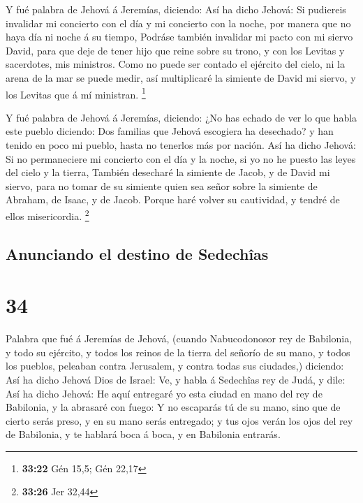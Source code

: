  Y fué palabra de Jehová á Jeremías, diciendo:
 Así ha dicho Jehová: Si pudiereis invalidar mi concierto
con el día y mi concierto con la noche, por manera que no haya día ni
noche á su tiempo,  Podráse también invalidar mi pacto
con mi siervo David, para que deje de tener hijo que reine sobre su
trono, y con los Levitas y sacerdotes, mis ministros. 
Como no puede ser contado el ejército del cielo, ni la arena de la mar
se puede medir, así multiplicaré la simiente de David mi siervo, y los
Levitas que á mí ministran. \footnote{\textbf{33:22} Gén 15,5; Gén 22,17}

 Y fué palabra de Jehová á Jeremías, diciendo:
 ¿No has echado de ver lo que habla este pueblo diciendo:
Dos familias que Jehová escogiera ha desechado? y han tenido en poco mi
pueblo, hasta no tenerlos más por nación.  Así ha dicho
Jehová: Si no permaneciere mi concierto con el día y la noche, si yo no
he puesto las leyes del cielo y la tierra,  También
desecharé la simiente de Jacob, y de David mi siervo, para no tomar de
su simiente quien sea señor sobre la simiente de Abraham, de Isaac, y de
Jacob. Porque haré volver su cautividad, y tendré de ellos misericordia.
\footnote{\textbf{33:26} Jer 32,44}

\hypertarget{anunciando-el-destino-de-sedechuxeeas}{%
\subsection{Anunciando el destino de
Sedechîas}\label{anunciando-el-destino-de-sedechuxeeas}}

\hypertarget{section-33}{%
\section{34}\label{section-33}}

 Palabra que fué á Jeremías de Jehová, (cuando
Nabucodonosor rey de Babilonia, y todo su ejército, y todos los reinos
de la tierra del señorío de su mano, y todos los pueblos, peleaban
contra Jerusalem, y contra todas sus ciudades,) diciendo: 
Así ha dicho Jehová Dios de Israel: Ve, y habla á Sedechîas rey de Judá,
y dile: Así ha dicho Jehová: He aquí entregaré yo esta ciudad en mano
del rey de Babilonia, y la abrasaré con fuego:  Y no
escaparás tú de su mano, sino que de cierto serás preso, y en su mano
serás entregado; y tus ojos verán los ojos del rey de Babilonia, y te
hablará boca á boca, y en Babilonia entrarás.

